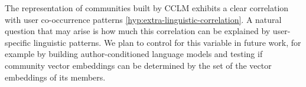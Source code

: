 \documentclass[11pt]{article}
\begin{document}
The representation of communities built by CCLM exhibits a clear
correlation with user co-occurrence patterns
\ref{hyp:extra-linguistic-correlation}. A natural
question that may arise is how much this correlation can be explained by
user-specific linguistic patterns. We plan to control for this variable
in future work, for example by building author-conditioned language
models and testing if community vector embeddings can be determined by
the set of the vector embeddings of its members.



\end{document}
